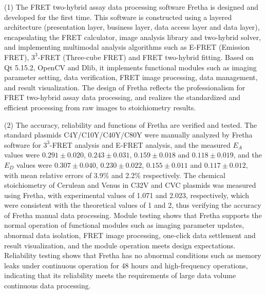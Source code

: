 \begin{eabstract}
(1) The FRET two-hybrid assay data processing software Fretha is designed and developed for the first time.
This software is constructed using a layered architecture (presentation layer, business layer, data access layer and data layer), encapsulating the FRET calculator, image analysis library and two-hybrid solver, and implementing multimodal analysis algorithms such as E-FRET (Emission FRET), $3^3$-FRET (Three-cube FRET) and FRET two-hybrid fitting.
Based on Qt 5.15.2, OpenCV and Dlib, it implements functional modules such as imaging parameter setting, data verification, FRET image processing, data management, and result visualization.
The design of Fretha reflects the professionalism for FRET two-hybrid assay data processing, and realizes the standardized and efficient processing from raw images to stoichiometry results.

(2) The accuracy, reliability and functions of Fretha are verified and tested.
The standard plasmids C4Y/C10Y/C40Y/C80Y were manually analyzed by Fretha software for $3^3$-FRET analysis and E-FRET analysis, and the measured $E_{A}$ values were $0.291\pm0.020$, $0.243\pm0.031$, $0.159\pm0.018$ and $0.118\pm0.019$, and the $E_{D}$ values were $0.307\pm0.040$, $0.230\pm0.022$, $0.155\pm0.011$ and $0.117\pm0.012$, with mean relative errors of 3.9\% and 2.2\% respectively.
The chemical stoichiometry of Cerulean and Venus in C32V and CVC plasmids was measured using Fretha, with experimental values of 1.071 and 2.023, respectively, which were consistent with the theoretical values of 1 and 2, thus verifying the accuracy of Fretha manual data processing.
Module testing shows that Fretha supports the normal operation of functional modules such as imaging parameter updates, abnormal data isolation, FRET image processing, one-click data settlement and result visualization, and the module operation meets design expectations.
Reliability testing shows that Fretha has no abnormal conditions such as memory leaks under continuous operation for 48 hours and high-frequency operations, indicating that its reliability meets the requirements of large data volume continuous data processing.


\end{eabstract}
